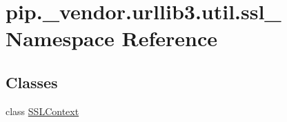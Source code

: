 \hypertarget{namespacepip_1_1__vendor_1_1urllib3_1_1util_1_1ssl__}{}\section{pip.\+\_\+vendor.\+urllib3.\+util.\+ssl\+\_\+ Namespace Reference}
\label{namespacepip_1_1__vendor_1_1urllib3_1_1util_1_1ssl__}
\subsection*{Classes}
\begin{DoxyCompactItemize}
\item 
class \hyperlink{classpip_1_1__vendor_1_1urllib3_1_1util_1_1ssl___1_1SSLContext}{S\+S\+L\+Context}
\end{DoxyCompactItemize}

